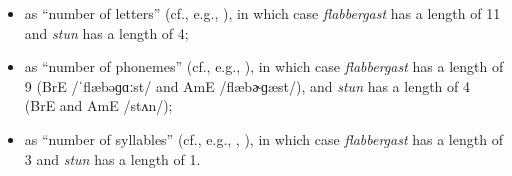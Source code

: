 \begin{itemize}
\item as ``number of letters'' (cf., e.g., \citealt{wulff_multifactorial_2003}), in which case \textit{flabbergast} has a length  of 11 and \textit{stun} has a length of 4;
\item as ``number of phonemes''  (cf., e.g., \citealt{sobkowiak_unmarked-before-marked_1993}), in which case \textit{flabbergast} has a length of 9 (BrE /ˈflæbəɡɑːst/ and AmE /flæbɚɡæst/), and \textit{stun} has a length of 4 (BrE and AmE /stʌn/);
\item as ``number of syllables''  (cf., e.g., \citealt{sobkowiak_unmarked-before-marked_1993}, \citealt{rohdenburg_constructional_2003}), in which case \textit{flabbergast} has a length  of 3 and \textit{stun} has a length of 1.
\end{itemize}

